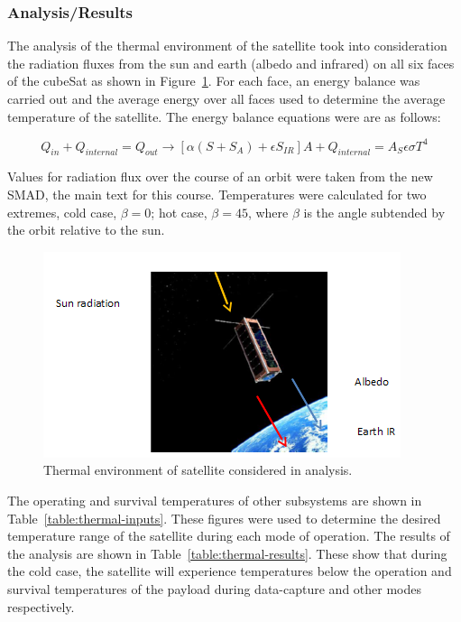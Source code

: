 \documentclass[12pt]{article}
\begin{document}
\subsubsection{Analysis/Results}

The analysis of the thermal environment of the satellite took into consideration the radiation fluxes from the sun and earth (albedo and infrared) on all six faces of the cubeSat as shown in Figure~\ref{fig:thermal-environment}. For each face, an energy balance was carried out and the average energy over all faces used to determine the average temperature of the satellite. The energy balance equations were are as follows:

\begin{equation}
Q_{in} + Q_{internal} = Q_{out} \rightarrow [\alpha(S + S_A) + \epsilon S_{IR}] A + Q_{internal} = A_S \epsilon \sigma T^4
\label{eq:thermal-balance}
\end{equation}		

Values for radiation flux over the course of an orbit were taken from the new SMAD, the main text for this course. Temperatures were calculated for two extremes, cold case, $\beta = 0$; hot case, $\beta =45$, where $\beta$ is the angle subtended by the orbit relative to the sun. 

\begin{figure}[ht]%
\centering
\includegraphics{images/thermal-environment}%
\caption{Thermal environment of satellite considered in analysis.}%
\label{fig:thermal-environment}%
\end{figure}

The operating and survival temperatures of other subsystems are shown in Table~\ref{table:thermal-inputs}. These figures were used to determine the desired temperature range of the satellite during each mode of operation. The results of the analysis are shown in Table~\ref{table:thermal-results}. These show that during the cold case, the satellite will experience temperatures below the operation and survival temperatures of the payload during data-capture and other modes respectively.
\end{document}
